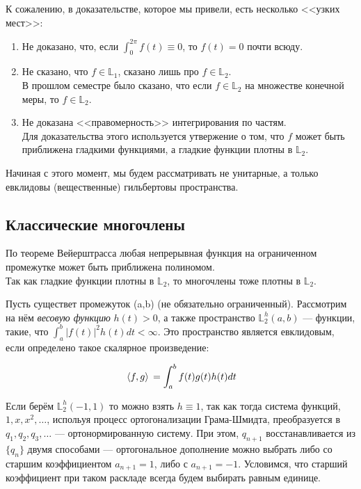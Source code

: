 \documentclass[12pt]{article}
\begin{document}
	К сожалению, в доказательстве, которое мы привели, есть несколько <<узких мест>>:
	\begin{enumerate}
		\item Не доказано, что, если $\int_0^{2\pi} f(t) \equiv 0$, то $f(t) = 0$ почти всюду.
		\item Не сказано, что $f \in \mathbb{L}_1$, сказано лишь про $f \in \mathbb{L}_2$. \\
		В прошлом семестре было сказано, что если $f \in \mathbb{L}_2$ на множестве конечной меры, то $f \in \mathbb{L}_2$.
		\item Не доказана <<правомерность>> интегрирования по частям. \\
		Для доказательства этого используется утвержение о том, что $f$ может быть приближена гладкими функциями, а
		гладкие функции плотны в $\mathbb{L}_2$.
	\end{enumerate}
	
	Начиная с этого момент, мы будем рассматривать не унитарные, а только евклидовы (вещественные) гильбертовы пространства.
	
	\subsection{Классические многочлены}
	По теореме Вейерштрасса любая непрерывная функция на ограниченном промежутке может быть приближена полиномом. \\
	Так как гладкие функции плотны в $\mathbb{L}_2$, то многочлены тоже плотны в $\mathbb{L}_2$.
	
	Пусть существет промежуток (a,b) (не обязательно ограниченный). Рассмотрим на нём \textit{весовую функцию} $h(t) > 0$, а также пространство
	$\mathbb{L}_2^h (a,b)$ --- функции, такие, что $\int_a^b |f(t)|^2 h(t) dt < \infty$.
	Это пространство является евклидовым, если определено такое скалярное произведение:
	
	$$ \, \langle f, g \rangle \, = \int_a^b f(t) g(t) h(t) dt $$
	
	Если берём $ \mathbb{L}_2^h (-1, 1)$ то можно взять $h \equiv 1$, так как тогда система функций,
	$1, x, x^2, \ldots$, испольуя процесс ортогонализации Грама-Шмидта, преобразуется в $q_1, q_2, q_3, \ldots$ --- ортонормированную 
	систему. При этом, $q_{n+1}$ восстанавливается из $ \{ q_n \} $ двумя способами --- ортогональное дополнение можно выбрать либо
	со старшим коэффициентом $a_{n+1} = 1$, либо с $a_{n+1} = -1$. Условимся, что старший коэффициент при таком раскладе всегда будем 
	выбирать равным единице.
	
\end{document}
